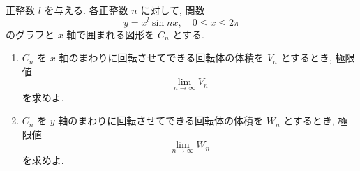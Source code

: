 正整数 $l$ を与える. 各正整数 $n$ に対して, 関数
\[
  y = x^l \sin nx, \quad 0 \le x \le 2\pi
\]
のグラフと $x$ 軸で囲まれる図形を $C_n$ とする.
\begin{enumerate}
  \item $C_n$ を $x$ 軸のまわりに回転させてできる回転体の体積を $V_n$ とするとき, 極限値
        \[
          \lim_{n \to \infty} V_n
        \]
        を求めよ.
  \item $C_n$ を $y$ 軸のまわりに回転させてできる回転体の体積を $W_n$ とするとき, 極限値
        \[
          \lim_{n \to \infty} W_n
        \]
        を求めよ.
\end{enumerate}